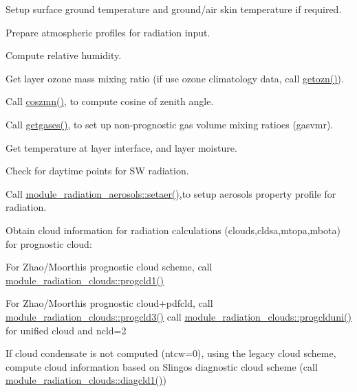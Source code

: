 \begin{DoxyEnumerate}
\item Setup surface ground temperature and ground/air skin temperature if required.
\item Prepare atmospheric profiles for radiation input.
\begin{DoxyItemize}
\item Compute relative humidity.
\item Get layer ozone mass mixing ratio (if use ozone climatology data, call \hyperlink{group__module__radiation__gases_ga91f9dd83a3832ad2615efb06b52eee92}{getozn()}).
\item Call \hyperlink{group__module__radiation__astronomy_ga804e1504ae720d0f33b507e7c42b6506}{coszmn()}, to compute cosine of zenith angle.
\item Call \hyperlink{group__module__radiation__gases_gacce60e9b372951eea9c6b3f28568e99c}{getgases()}, to set up non-\/prognostic gas volume mixing ratioes (gasvmr).
\item Get temperature at layer interface, and layer moisture.
\item Check for daytime points for SW radiation.
\item Call \hyperlink{group__module__radiation__aerosols_ga184fcc0618c1c4d42fa08cfe1e20e5c1}{module\+\_\+radiation\+\_\+aerosols\+::setaer()},to setup aerosols property profile for radiation.
\item Obtain cloud information for radiation calculations (clouds,cldsa,mtopa,mbota) ~\newline
 for prognostic cloud\+:
\begin{DoxyItemize}
\item For Zhao/\+Moorthi\textquotesingle{}s prognostic cloud scheme, call \hyperlink{group__module__radiation__clouds_gafa23f5bc69fa713abfa32939fd96ade8}{module\+\_\+radiation\+\_\+clouds\+::progcld1()}
\item For Zhao/\+Moorthi\textquotesingle{}s prognostic cloud+pdfcld, call \hyperlink{group__module__radiation__clouds_gaeab51a06b22516fbfc78ab2c9eaf2622}{module\+\_\+radiation\+\_\+clouds\+::progcld3()} call \hyperlink{group__module__radiation__clouds_gaa369e2e2910b3468614db856b378f3ba}{module\+\_\+radiation\+\_\+clouds\+::progclduni()} for unified cloud and ncld=2
\end{DoxyItemize}
\item If cloud condensate is not computed (ntcw=0), using the legacy cloud scheme, compute cloud information based on Slingo\textquotesingle{}s diagnostic cloud scheme (call \hyperlink{group__module__radiation__clouds_ga022c3706242426745001b7837ae801a3}{module\+\_\+radiation\+\_\+clouds\+::diagcld1()})

\end{DoxyItemize}
\end{DoxyEnumerate}
